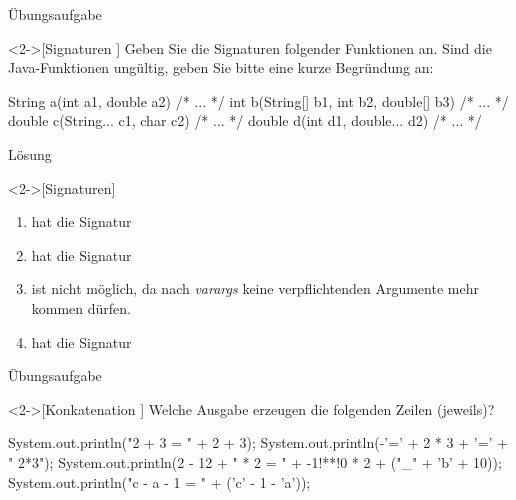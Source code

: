 \begin{frame}[c,fragile]{Übungsaufgabe}
    \begin{exercise}<2->[Signaturen ]
        \pause{}Geben Sie die Signaturen folgender Funktionen an.\pause{} Sind die Java-Funktionen ungültig, geben Sie bitte eine kurze Begründung an:\pause{}
        \begin{plainvoid}
String a(int a1, double a2) { /* ... */ }
int b(String[] b1, int b2, double[] b3) { /* ... */ }
double c(String... c1, char c2) { /* ... */ }
double d(int d1, double... d2) { /* ... */ }
        \end{plainvoid}
    \end{exercise}
\end{frame}

\begin{frame}[c]{Lösung}
    \begin{solve}<2->[Signaturen]
        \begin{enumerate}[<+(1)->]
            \item {} hat die Signatur 
            \item {} hat die Signatur 
            \item {} ist nicht möglich,\pause{} da nach \emph{varargs} keine verpflichtenden Argumente mehr kommen dürfen.
            \item {} hat die Signatur 
        \end{enumerate}
    \end{solve}
\end{frame}

\begin{frame}[c,fragile]{Übungsaufgabe}
    \begin{exercise}<2->[Konkatenation ]
        \pause{}Welche Ausgabe erzeugen die folgenden Zeilen (jeweils)?\pause{}
        \begin{plainjava}
System.out.println("2 + 3 = " + 2 + 3);
System.out.println(-'=' + 2 * 3 + '=' + " 2*3");
System.out.println(2 - 12 + " * 2 = " + -1!**!0 * 2 + ("_" + 'b' + 10));
System.out.println("c - a - 1 = " + ('c' - 1 - 'a'));
        \end{plainjava}
    \end{exercise}
\end{frame}

